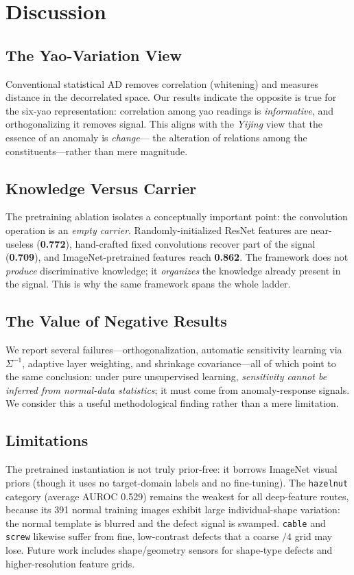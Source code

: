 \documentclass[journal,10pt]{IEEEtran}
\begin{document}
\section{Discussion}
\subsection{The Yao-Variation View}
Conventional statistical AD removes correlation (whitening) and measures
distance in the decorrelated space. Our results indicate the opposite is
true for the six-yao representation: correlation among yao readings is
\emph{informative}, and orthogonalizing it removes signal. This aligns with
the \emph{Yijing} view that the essence of an anomaly is \emph{change}---
the alteration of relations among the constituents---rather than mere
magnitude.

\subsection{Knowledge Versus Carrier}
The pretraining ablation isolates a conceptually important point: the
convolution operation is an \emph{empty carrier}. Randomly-initialized
ResNet features are near-useless (\textbf{0.772}), hand-crafted fixed
convolutions recover part of the signal (\textbf{0.709}), and
ImageNet-pretrained features reach \textbf{0.862}. The framework does not
\emph{produce} discriminative knowledge; it \emph{organizes} the knowledge
already present in the signal. This is why the same framework spans the
whole ladder.

\subsection{The Value of Negative Results}
We report several failures---orthogonalization, automatic sensitivity
learning via $\Sigma^{-1}$, adaptive layer weighting, and shrinkage
covariance---all of which point to the same conclusion: under pure
unsupervised learning, \emph{sensitivity cannot be inferred from
normal-data statistics}; it must come from anomaly-response signals. We
consider this a useful methodological finding rather than a mere
limitation.

\subsection{Limitations}
The pretrained instantiation is not truly prior-free: it borrows ImageNet
visual priors (though it uses no target-domain labels and no fine-tuning).
The \texttt{hazelnut} category (average AUROC 0.529) remains the weakest
for all deep-feature routes, because its 391 normal training images exhibit
large individual-shape variation: the normal template is blurred and the
defect signal is swamped. \texttt{cable} and \texttt{screw} likewise
suffer from fine, low-contrast defects that a coarse $/4$ grid may lose.
Future work includes shape/geometry sensors for shape-type defects and
higher-resolution feature grids.
\end{document}
